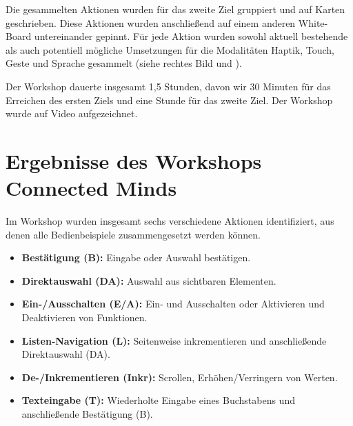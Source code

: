Die gesammelten Aktionen wurden für das zweite Ziel gruppiert und auf Karten geschrieben. Diese Aktionen wurden anschließend auf einem anderen White-Board untereinander gepinnt. 
Für jede Aktion wurden sowohl aktuell bestehende als auch potentiell mögliche Umsetzungen für die Modalitäten Haptik, Touch, Geste und Sprache gesammelt (siehe  rechtes Bild und ). 

Der Workshop dauerte insgesamt 1,5 Stunden, davon wir 30 Minuten für das Erreichen des ersten Ziels und eine Stunde für das zweite Ziel. 
Der Workshop wurde auf Video aufgezeichnet.
\section[Ergebnisse des Workshops]{Ergebnisse des Workshops Connected Minds}
Im Workshop wurden insgesamt sechs verschiedene Aktionen identifiziert, aus denen alle Bedienbeispiele zusammengesetzt werden können.
\begin{itemize}
	\item \textbf{Bestätigung (B):} Eingabe oder Auswahl bestätigen.
	\item \textbf{Direktauswahl (DA):} Auswahl aus sichtbaren Elementen.
	\item \textbf{Ein-/Ausschalten (E/A):} Ein- und Ausschalten oder Aktivieren und Deaktivieren von Funktionen.
	\item \textbf{Listen-Navigation (L):} Seitenweise inkrementieren und anschließende Direktauswahl (DA).
	\item \textbf{De-/Inkrementieren (Inkr):}  Scrollen, Erhöhen/Verringern von Werten.
	\item \textbf{Texteingabe (T):}  Wiederholte Eingabe eines Buchstabens und anschließende Bestätigung (B).
\end{itemize}

